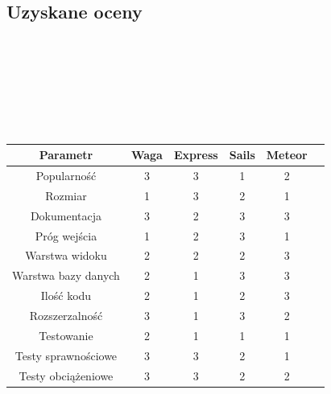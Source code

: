 \documentclass[12pt]{report}
\begin{document}
    \subsection{Uzyskane oceny}
      \hspace{1 mm} \\
      \hspace{1 mm} \\
      \hspace{1 mm} \\
      \hspace{1 mm} \\
      \hspace{1 mm} \\
      \hspace{1 mm} \\
      \begingroup
        \begin{adjustbox}{center}
          \begin{tabular}{|c|c|c|c|c|p{2.6cm}}
            \hline
            Parametr & Waga & Express & Sails & Meteor \\
            \hline
            Popularność & 3 & 3 & 1 & 2 \\
            \hline
            Rozmiar & 1 & 3 & 2 & 1 \\
            \hline
            Dokumentacja & 3 & 2 & 3 & 3 \\
            \hline
            Próg wejścia & 1 & 2 & 3 & 1 \\
            \hline
            Warstwa widoku & 2 & 2 & 2 & 3 \\
            \hline
            Warstwa bazy danych & 2 & 1 & 3 & 3 \\
            \hline
            Ilość kodu & 2 & 1 & 2 & 3 \\
            \hline
            Rozszerzalność & 3 & 1 & 3 & 2 \\
            \hline
            Testowanie & 2 & 1 & 1 & 1 \\
            \hline
            Testy sprawnościowe & 3 & 3 & 2 & 1 \\
            \hline
            Testy obciążeniowe & 3 & 3 & 2 & 2 \\
            \hline
          \end{tabular}
        \end{adjustbox}
      \endgroup
      \hspace{1 mm} \\
      \hspace{1 mm} \\
      \hspace{1 mm} \\
      \hspace{1 mm} \\
      \hspace{1 mm} \\
      
\end{document}
